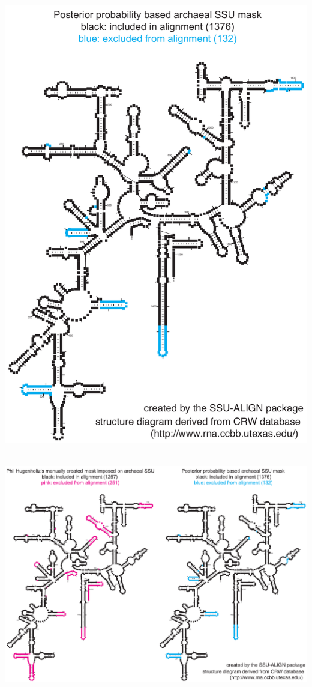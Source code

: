 \documentclass[landscape]{slides}
\begin{document}
\begin{slide}\begin{center}\includegraphics[height=8in]{figs/archaea-mask-pp-only}\end{center}\vfill\end{slide}
\begin{slide}\begin{center}\includegraphics[width=10.5in]{figs/archaea-mask-ph-v-pp-both}\end{center}\vfill\end{slide}
\end{document}
